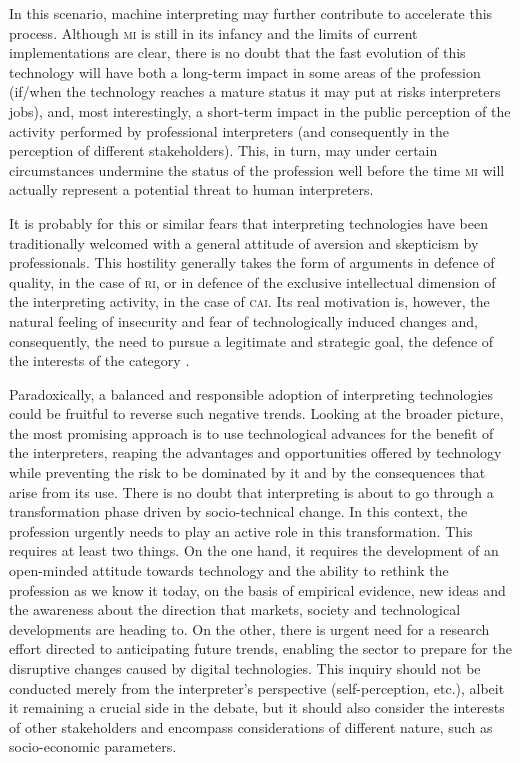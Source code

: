 \documentclass[output=paper]{langsci/langscibook}
\begin{document}
\largerpage 
In this scenario, machine interpreting may further contribute to accelerate this process. Although \textsc{mi} is still in its infancy and the limits of current implementations are clear, there is no doubt that the fast evolution of this technology will have both a long-term impact in some areas of the profession (if/when the technology reaches a mature status it may put at risks interpreters jobs), and, most interestingly, a short-term impact in the public perception of the activity performed by professional interpreters (and consequently in the perception of different stakeholders). This, in turn, may under certain circumstances undermine the status of the profession well before the time  \textsc{mi} will actually represent a potential threat to human interpreters. 

It is probably for this or similar fears that interpreting technologies have been traditionally welcomed with a general attitude of aversion and skepticism by professionals. This hostility generally takes the form of arguments in defence of quality, in the case of \textsc{ri}, or in defence of the exclusive intellectual dimension of the interpreting activity, in the case of \textsc{cai}. Its real motivation is, however, the natural feeling of insecurity and fear of technologically induced changes and, consequently, the need to pursue a legitimate and strategic goal, the defence of the interests of the category \citep{pym_what_2011}. 
 
Paradoxically, a balanced and responsible adoption of interpreting technologies could be fruitful to reverse such negative trends. Looking at the broader picture, the most promising approach is to use technological advances for the benefit of the interpreters, reaping the advantages and opportunities offered by technology while preventing the risk to be dominated by it and by the consequences that arise from its use. There is no doubt that interpreting is about to go through a transformation phase driven by socio-technical change. In this context, the profession urgently needs to play an active role in this transformation. This requires at least two things. On the one hand, it requires the development of an open-minded attitude towards technology and the ability to rethink the profession as we know it today, on the basis of empirical evidence, new ideas and the awareness about the direction that markets, society and technological developments are heading to. On the other, there is urgent need for a research effort directed to anticipating future trends, enabling the sector to prepare for the disruptive changes caused by digital technologies. This inquiry should not be conducted merely from the interpreter’s perspective (self-perception, etc.), albeit it remaining a crucial side in the debate, but it should also consider the interests of other stakeholders and encompass considerations of different nature, such as socio-economic parameters. 
\end{document}
